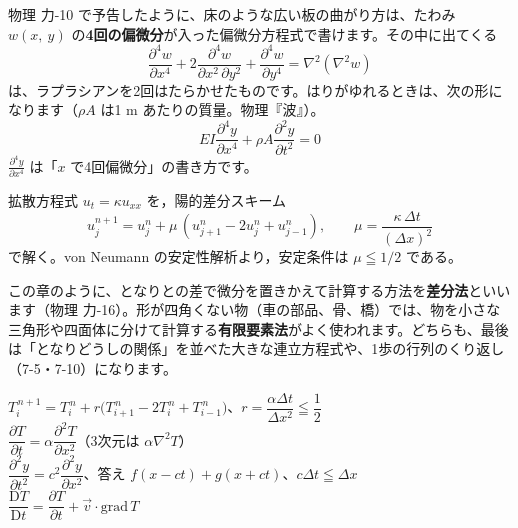 \begin{motto}[5]
物理 力-10 で予告したように、床のような広い板の曲がり方は、たわみ $w(x,\ y)$ の\textbf{4回の偏微分}が入った偏微分方程式で書けます。その中に出てくる
\[ \frac{\partial^4w}{\partial x^4}+2\frac{\partial^4w}{\partial x^2\,\partial y^2}+\frac{\partial^4w}{\partial y^4}=\nabla^2(\nabla^2w) \]
は、ラプラシアンを2回はたらかせたものです。はりがゆれるときは、次の形になります（$\rho A$ は1 m あたりの質量。物理『波』）。
\[ EI\frac{\partial^4y}{\partial x^4}+\rho A\frac{\partial^2y}{\partial t^2}=0 \]
$\tfrac{\partial^4y}{\partial x^4}$ は「$x$ で4回偏微分」の書き方です。
\end{motto}


\begin{senmonsho}[大学の教科書ふうの書き方]
\begin{bkhonbun}
拡散方程式 $u_t=\kappa u_{xx}$ を，陽的差分スキーム
\[ u_j^{n+1}=u_j^n+\mu\,(u_{j+1}^n-2u_j^n+u_{j-1}^n),\qquad \mu=\frac{\kappa\,\Delta t}{(\Delta x)^2} \]
で解く。von Neumann の安定性解析より，安定条件は $\mu\leqq1/2$ である。
\end{bkhonbun}
\end{senmonsho}

\begin{motto}[4]
この章のように、となりとの差で微分を置きかえて計算する方法を\textbf{差分法}といいます（物理 力-16）。形が四角くない物（車の部品、骨、橋）では、物を小さな三角形や四面体に分けて計算する\textbf{有限要素法}がよく使われます。どちらも、最後は「となりどうしの関係」を並べた大きな連立方程式や、1歩の行列のくり返し（7-5・7-10）になります。
\end{motto}

\begin{taisetsu}
\def\tsl#1{\makebox[7.4\zw][l]{\sffamily\bfseries\small\color{\bkTT}#1}}
\tsl{1歩の式}$T_i^{\,n+1}=T_i^{\,n}+r\bigl(T_{i+1}^{\,n}-2T_i^{\,n}+T_{i-1}^{\,n}\bigr)$、$r=\dfrac{\alpha\Delta t}{\Delta x^2}\leqq\dfrac12$\\[4pt]
\tsl{熱方程式}$\dfrac{\partial T}{\partial t}=\alpha\dfrac{\partial^2T}{\partial x^2}$（3次元は $\alpha\nabla^2T$）\\[4pt]
\tsl{波動方程式}$\dfrac{\partial^2y}{\partial t^2}=c^2\dfrac{\partial^2y}{\partial x^2}$、答え $f(x-ct)+g(x+ct)$、$c\Delta t\leqq\Delta x$\\[4pt]
\tsl{物質微分}$\dfrac{\mathrm DT}{\mathrm Dt}=\dfrac{\partial T}{\partial t}+\vec v\cdot\mathrm{grad}\,T$
\end{taisetsu}

